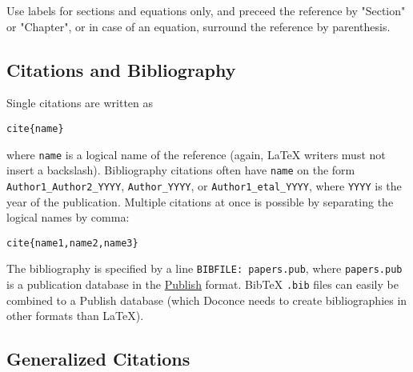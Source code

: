 \documentclass[%
oneside,                 %
final,                   %
10pt]{article}
\begin{document}
Use labels for sections and equations only, and preceed the reference
by "Section" or "Chapter", or in case of an equation, surround the
reference by parenthesis.


\subsection{Citations and Bibliography}

Single citations are written as
\begin{Verbatim}[numbers=none,fontsize=\fontsize{9pt}{9pt},baselinestretch=0.85,xleftmargin=0mm]
cite{name}
\end{Verbatim}
where \Verb!name! is a logical name
of the reference (again, {\LaTeX} writers must not insert a backslash).
Bibliography citations often have \Verb!name! on the form
\Verb!Author1_Author2_YYYY!, \Verb!Author_YYYY!, or \Verb!Author1_etal_YYYY!, where
\Verb!YYYY! is the year of the publication.
Multiple citations at once is possible by separating the logical names
by comma:
\begin{Verbatim}[numbers=none,fontsize=\fontsize{9pt}{9pt},baselinestretch=0.85,xleftmargin=0mm]
cite{name1,name2,name3}
\end{Verbatim}

The bibliography is specified by a line \Verb!BIBFILE: papers.pub!,
where \Verb!papers.pub! is a publication database in the
\href{{https://bitbucket.org/logg/publish}}{Publish} format.
BibTeX \Verb!.bib! files can easily be combined to a Publish database
(which Doconce needs to create bibliographies in other formats
than {\LaTeX}).

\subsection{Generalized Citations}
\end{document}
